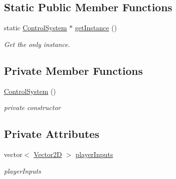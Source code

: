 \subsection*{Static Public Member Functions}
\begin{DoxyCompactItemize}
\item 
\mbox{\label{class_control_system_ad977d8c4661a10463f55703065bbe2bc}} 
static \mbox{\hyperlink{class_control_system}{Control\+System}} $\ast$ \mbox{\hyperlink{class_control_system_ad977d8c4661a10463f55703065bbe2bc}{get\+Instance}} ()
\begin{DoxyCompactList}\small\item\em Get the only instance. \end{DoxyCompactList}\end{DoxyCompactItemize}
\subsection*{Private Member Functions}
\begin{DoxyCompactItemize}
\item 
\mbox{\label{class_control_system_a4b8f52561261c53303c3db0a06ddceed}} 
\mbox{\hyperlink{class_control_system_a4b8f52561261c53303c3db0a06ddceed}{Control\+System}} ()
\begin{DoxyCompactList}\small\item\em private constructor \end{DoxyCompactList}\end{DoxyCompactItemize}
\subsection*{Private Attributes}
\begin{DoxyCompactItemize}
\item 
\mbox{\label{class_control_system_aa8fb55ea98d7040c1c20383dce3b5f56}} 
vector$<$ \mbox{\hyperlink{struct_vector2_d}{Vector2D}} $>$ \mbox{\hyperlink{class_control_system_aa8fb55ea98d7040c1c20383dce3b5f56}{player\+Inputs}}
\begin{DoxyCompactList}\small\item\em player\+Inputs \end{DoxyCompactList}\end{DoxyCompactItemize}
